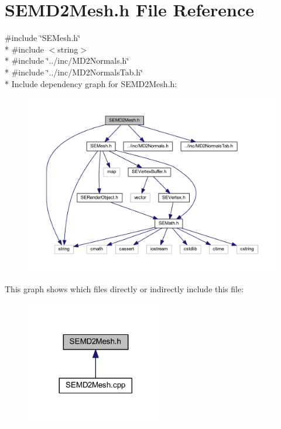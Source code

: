 \section{S\+E\+M\+D2\+Mesh.\+h File Reference}
\label{_s_e_m_d2_mesh_8h}
{\ttfamily \#include \char`\"{}S\+E\+Mesh.\+h\char`\"{}}\\*
{\ttfamily \#include $<$string$>$}\\*
{\ttfamily \#include \char`\"{}../inc/\+M\+D2\+Normals.\+h\char`\"{}}\\*
{\ttfamily \#include \char`\"{}../inc/\+M\+D2\+Normals\+Tab.\+h\char`\"{}}\\*
Include dependency graph for S\+E\+M\+D2\+Mesh.\+h\+:
\nopagebreak
\begin{figure}[H]
\begin{center}
\leavevmode
\includegraphics[width=350pt]{_s_e_m_d2_mesh_8h__incl}
\end{center}
\end{figure}
This graph shows which files directly or indirectly include this file\+:
\nopagebreak
\begin{figure}[H]
\begin{center}
\leavevmode
\includegraphics[width=173pt]{_s_e_m_d2_mesh_8h__dep__incl}
\end{center}
\end{figure}
